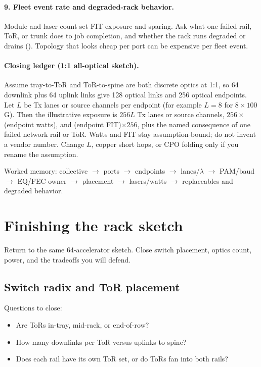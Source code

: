 \paragraph{9. Fleet event rate and degraded-rack behavior.}
Module and laser count set FIT exposure and sparing. Ask what one failed rail,
ToR, or trunk does to job completion, and whether the rack runs degraded or
drains (). Topology that looks cheap
per port can be expensive per fleet event.

\paragraph{Closing ledger (1:1 all-optical sketch).}
Assume tray-to-ToR and ToR-to-spine are both discrete optics at 1:1, so 64
downlink plus 64 uplink links give 128 optical links and 256 optical endpoints.
Let $L$ be Tx lanes or source channels per endpoint (for example $L=8$ for
$8\times100$G). Then the illustrative exposure is $256L$ Tx lanes or source
channels, $256\times$ (endpoint watts), and (endpoint FIT)$\times 256$, plus
the named consequence of one failed network rail or ToR. Watts and FIT stay
assumption-bound; do not invent a vendor number. Change $L$, copper short
hops, or CPO folding only if you rename the assumption.

{\raggedright\footnotesize Worked memory: collective $\rightarrow$ ports
$\rightarrow$ endpoints $\rightarrow$ lanes/$\lambda$ $\rightarrow$ PAM/baud
$\rightarrow$ EQ/FEC owner $\rightarrow$ placement $\rightarrow$ lasers/watts
$\rightarrow$ replaceables and degraded behavior.\par}

\section{Finishing the rack sketch}
\label{sec:hpc-rack-close}

Return to the same 64-accelerator sketch. Close switch placement, optics count,
power, and the tradeoffs you will defend.

\subsection{Switch radix and ToR placement}
\label{sec:hpc-rack-tor}

Questions to close:

\begin{itemize}
\item Are ToRs in-tray, mid-rack, or end-of-row?
\item How many downlinks per ToR versus uplinks to spine?
\item Does each rail have its own ToR set, or do ToRs fan into both rails?
\end{itemize}


